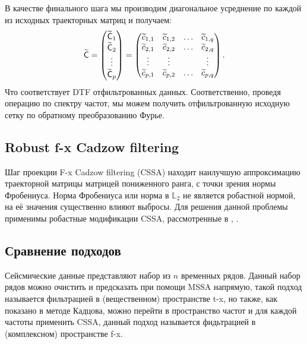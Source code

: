 \documentclass[specialist,
               substylefile = spbu.rtx,
               subf,href,colorlinks=true, 12pt]{disser}
\begin{document}
В качестве финального шага мы производим диагональное усреднение по каждой из исходных траекторных матриц и получаем:
$$\widetilde{\textsf{C}} = 
\begin{pmatrix}
           \widetilde{\textsf{C}}_1 \\
           \widetilde{\textsf{C}}_2\\
           \vdots\\
           \widetilde{\textsf{C}}_p
         \end{pmatrix}
= \begin{pmatrix}
           \widetilde{c}_{1,1} & \widetilde{c}_{1,2} & \ldots & \widetilde{c}_{1,q}\\
           \widetilde{c}_{2,1} & \widetilde{c}_{2,2} & \ldots & \widetilde{c}_{2,q}\\
           \vdots & \vdots & & \vdots\\
           \widetilde{c}_{p,1} & \widetilde{c}_{p,2} & \ldots & \widetilde{c}_{p,q}
         \end{pmatrix}.$$
Что соответствует DTF отфильтрованных данных. Соответственно, проведя операцию по спектру частот, мы можем получить отфильтрованную исходную сетку по обратному преобразованию Фурье.

\subsection{Robust f-x Cadzow filtering}
\label{sub:fxRobust}

Шаг проекции F-x Cadzow filtering (CSSA) находит наилучшую аппроксимацию траекторной матрицы матрицей пониженного ранга, с точки зрения нормы Фробениуса. Норма Фробениуса или норма в $\mathbb{L}_2$ не является робастной нормой, на её значения существенно влияют выбросы. Для решения данной проблемы применимы робастные модификации CSSA, рассмотренные в \cite{Chen}, \cite{Galbraith.etal15}.




\subsection{Сравнение подходов}
\label{sub:fxtxcomp}
Сейсмические данные представляют набор из $n$ временных рядов. Данный набор рядов можно очистить и предсказать при помощи MSSA напрямую, такой подход называется фильтрацией в (вещественном) пространстве t-x, но также, как показано в методе Кадцова, можно перейти в пространство частот и для каждой частоты применить CSSA, данный подход называется фидьтрацией в (комплексном) пространстве f-x.
\end{document}
